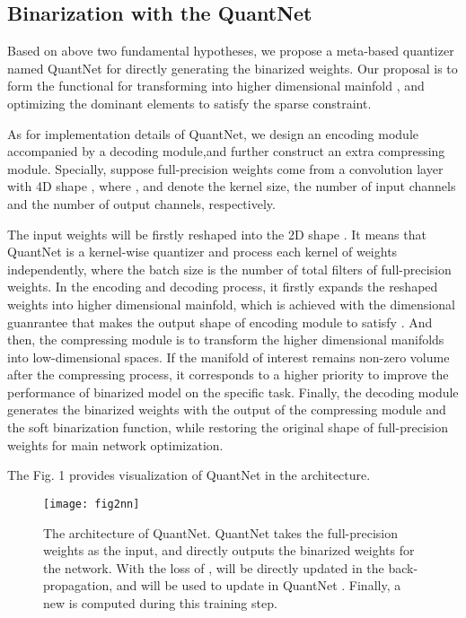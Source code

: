 \documentclass[runningheads]{llncs}
\begin{document}
\subsection{Binarization with the QuantNet}
Based on above two fundamental hypotheses,
we propose a meta-based quantizer named QuantNet for directly generating the binarized weights.
Our proposal is to form the functional  for transforming 
into higher dimensional mainfold ,
and optimizing the dominant elements  to satisfy the sparse constraint.

As for implementation details of QuantNet,
we design an encoding module accompanied by a decoding module,and further construct an extra compressing module. Specially, suppose full-precision weights come from a convolution layer
with 4D shape ,
where ,  and  denote the kernel size, the number of input channels and the number of output channels, respectively.

The input weights will be firstly reshaped into the 2D shape .
It means that QuantNet is a kernel-wise quantizer and process each kernel of weights independently,
where the batch size is the number of total filters of full-precision weights.
In the encoding and decoding process, it firstly expands the reshaped weights into higher dimensional mainfold,
which is achieved with the dimensional guanrantee that makes
the output shape of encoding module to satisfy .
And then, the compressing module is to transform the higher dimensional manifolds into low-dimensional spaces.
If the manifold of interest remains non-zero volume after the compressing process,
it corresponds to a higher priority to improve the performance of binarized model on the specific task.
Finally, the decoding module generates the binarized weights
with the output of the compressing module and the soft binarization function,
while restoring the original shape of full-precision weights for main network optimization.

The Fig. 1 provides visualization of QuantNet in the architecture.

\begin{figure}[t]
  \centering
  \texttt{[image: fig2nn]}
  \caption{The architecture of QuantNet. QuantNet  takes the full-precision weights  as the input, and directly outputs the binarized weights  for the network. With the loss of ,   will be directly updated in the back-propagation, and  will be used to update  in QuantNet . Finally, a new  is computed during this training step.}\label{fig:QuanNet}
\end{figure}
\end{document}
